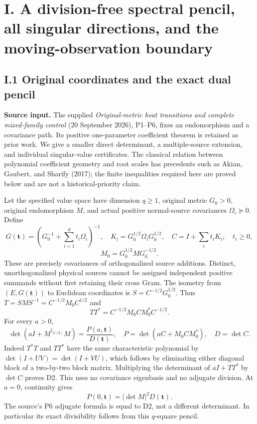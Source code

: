 \section{I. A division-free spectral pencil, all singular directions, and the moving-observation boundary}\label{i.-a-division-free-spectral-pencil-all-singular-directions-and-the-moving-observation-boundary}

\subsection{I.1 Original coordinates and the exact dual pencil}\label{i.1-original-coordinates-and-the-exact-dual-pencil}

\textbf{Source input.} The supplied \emph{Original-metric heat transitions and complete mixed-family control} (20 September 2026), P1--P6, fixes an endomorphism and a covariance path. Its positive one-parameter coefficient theorem is retained as prior work. We give a smaller direct determinant, a multiple-source extension, and individual singular-value certificates. The classical relation between polynomial coefficient geometry and root scales has precedents such as Akian, Gaubert, and Sharify (2017); the finite inequalities required here are proved below and are not a historical-priority claim.

Let the specified value space have dimension \(q\ge1\), original metric \(G_0>0\), original endomorphism \(M\), and actual positive normal-source covariances \(\Omega_i\succeq0\). Define \[
 G(\boldsymbol t)=(G_0^{-1}+\sum_{i=1}^d t_i\Omega_i)^{-1},\quad
 K_i=G_0^{1/2}\Omega_iG_0^{1/2},\quad
 C=I+\sum_i t_iK_i,\quad t_i\ge0,
\] \[
 M_0=G_0^{1/2}MG_0^{-1/2}.
 \tag{D1}
\] These are precisely covariances of orthogonalized source additions. Distinct, unorthogonalized physical sources cannot be assigned independent positive summands without first retaining their cross Gram. The isometry from \((E,G(\boldsymbol t))\) to Euclidean coordinates is \(S=C^{-1/2}G_0^{1/2}\). Thus \(T=SMS^{-1}=C^{-1/2}M_0C^{1/2}\) and \[
 TT^*=C^{-1/2}M_0CM_0^*C^{-1/2}.
\] For every \(a>0\), \[
 \boxed{\det(aI+M^{\dagger_{G(\boldsymbol t)}}M)
 =\frac{P(a,\boldsymbol t)}{D(\boldsymbol t)},\quad
 P=\det(aC+M_0CM_0^*),\quad D=\det C.}
 \tag{D2}
\] Indeed \(T^*T\) and \(TT^*\) have the same characteristic polynomial by \(\det(I+UV)=\det(I+VU)\), which follows by eliminating either diagonal block of a two-by-two block matrix. Multiplying the determinant of \(aI+TT^*\) by \(\det C\) proves D2. This uses no covariance eigenbasis and no adjugate division. At \(a=0\), continuity gives \[
 P(0,\boldsymbol t)=|\det M|^2D(\boldsymbol t).
 \tag{D3}
\] The source's P6 adjugate formula is equal to D2, not a different determinant. In particular its exact divisibility follows from this \(q\)-square pencil.

